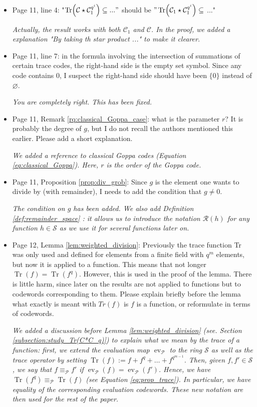 \documentclass[12pt,a4paper]{amsart}
\DeclareMathOperator{\trace}{Tr}
\DeclareMathOperator{\ev}{ev}
\newcommand{\calC}{\mathcal{C}}
\newcommand{\calP}{\mathcal{P}}
\newcommand{\Tr}[1]{\trace\!\left(#1\right)}
\begin{document}
\begin{itemize}
\item Page 11, line 4: "$\Tr{\calC \star \calC_1^{q^i}} \subseteq ..."$ should be $"\Tr{\calC_1 \star \calC_1^{q^i}} \subseteq$ ..."

\textit{Actually, the result works with both $\calC_1$ and $\calC$. In the proof, we added a explanation  "By taking th star product ..." to make it clearer.} 

\item Page 11, line 7: in the formula involving the intersection of summations of certain trace codes, the right-hand side is the empty set symbol. Since any code contains 0, I suspect the right-hand side should have been $\{0\}$ instead of $\varnothing$.

\textit{You are completely right. This has been fixed.}

\item Page 11, Remark \ref{rq:classical_Goppa_case}: what is the parameter $r$? It is probably the degree of $g$, but I do not recall the authors mentioned this earlier. Please add a short explanation.

\textit{We added a reference to classical Goppa codes (Equation \eqref{eq:classical_Goppa}). Here, $r$ is the order of the Goppa code.} 

\item Page 11, Proposition \ref{prop:div_grob}: Since $g$ is the element one wants to divide by (with remainder), I needs to add the condition that $g \neq 0$.

\textit{The condition on $g$ has been added. We also add Definition \ref{def:remainder_space} : it allows us to introduce the notation $\mathcal{R}(h)$ for any function $h \in \mathcal{S}$ as we use it for several functions later on.} 

\item Page 12, Lemma \ref{lem:weighted_division}: Previously the trace function Tr was only used and defined for elements from a finite field with $q^m$ elements, but now it is applied to a function. This means that not longer $\Tr{f}=\Tr{f^q}$. However, this is used in the proof of the lemma. There is little harm, since later on the results are not applied to functions but to codewords corresponding to them. Please explain briefly before the lemma what exactly is meant with $Tr(f)$ is $f$ is a function, or reformulate in terms of codewords.

\textit{We added a discussion before Lemma \ref{lem:weighted_division} (see. Section \ref{subsection:study_Tr(C*C_q)}) to explain what we mean by the trace of a function: first, we extend the evaluation map $\ev_{\calP}$ to the ring $\mathcal{S}$ as well as the trace operator by setting $\Tr{f}:=f+f^q+\dots + f^{q^{m-1}}$. Then, given $f,f' \in \mathcal{S}$, we say that $f \equiv_{\calP} f'$ if $\ev_{\calP}(f)=\ev_{\calP}(f')$. Hence, we have $\Tr{f^q} \equiv_{\calP}\Tr{f}$ (see Equation \eqref{eq:prop_trace}). In particular, we have equality of the corresponding evaluation codewords. These new notation are then used for the rest of the paper.}


\end{itemize}
\end{document}
